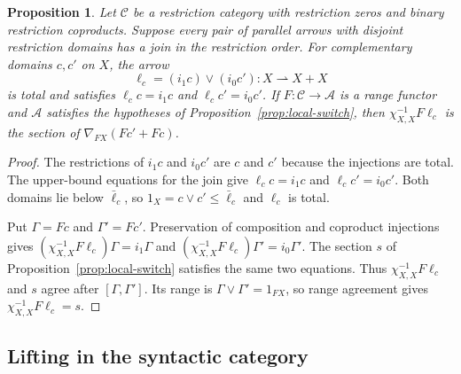 \documentclass[11pt]{article}
\newtheorem{proposition}[theorem]{Proposition}
\begin{document}
\begin{proposition}\label{prop:disjoint-joins}
Let $\mathcal C$ be a restriction category with restriction zeros and
binary restriction coproducts. Suppose every pair of parallel arrows
with disjoint restriction domains has a join in the restriction order.
For complementary domains $c,c'$ on $X$, the arrow
\[
 \ell_c=(i_1c)\vee(i_0c'):X\rightharpoonup X+X
\]
is total and satisfies $\ell_cc=i_1c$ and $\ell_cc'=i_0c'$.
If $F:\mathcal C\to\mathcal A$ is a range functor and $\mathcal A$
satisfies the hypotheses of Proposition~\ref{prop:local-switch},
then $\chi_{X,X}^{-1}F\ell_c$ is the section of
$\nabla_{FX}(Fc'+Fc)$.
\end{proposition}
\begin{proof}
The restrictions of $i_1c$ and $i_0c'$ are $c$ and $c'$ because
the injections are total. The upper-bound equations for the join
give $\ell_cc=i_1c$ and $\ell_cc'=i_0c'$.
Both domains lie below $\bar\ell_c$, so
$1_X=c\vee c'\le\bar\ell_c$ and $\ell_c$ is total.

Put $\Gamma=Fc$ and $\Gamma'=Fc'$. Preservation of composition
and coproduct injections gives
$(\chi_{X,X}^{-1}F\ell_c)\Gamma=i_1\Gamma$ and
$(\chi_{X,X}^{-1}F\ell_c)\Gamma'=i_0\Gamma'$.
The section $s$ of Proposition~\ref{prop:local-switch} satisfies the
same two equations. Thus $\chi_{X,X}^{-1}F\ell_c$ and $s$ agree after
$[\Gamma,\Gamma']$. Its range is
$\Gamma\vee\Gamma'=1_{FX}$, so range agreement gives
$\chi_{X,X}^{-1}F\ell_c=s$.
\end{proof}

\subsection{Lifting in the syntactic category}
\end{document}
